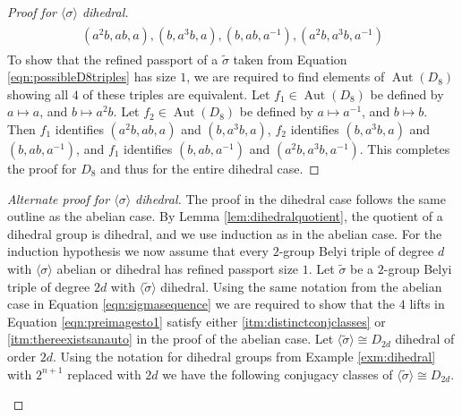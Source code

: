 \documentclass{dcthesis}
\newcommand{\wt}[1]{\widetilde{#1}}
\DeclareMathOperator{\Aut}{Aut}
\numberwithin{equation}{section}
\theoremstyle{definition}
\theoremstyle{remark}
\begin{document}
{{\begin{proof}[Proof for $\langle\sigma\rangle$ dihedral]
\begin{align}
\begin{split}
          (a^2b,ab,a),
          (b,a^3b,a),
          (b,ab,a^{-1}),
          (a^2b,a^3b,a^{-1})
        \end{split}
      \end{align}
      To show that the refined passport
      of a $\wt{\sigma}$ taken from
      Equation \ref{eqn:possibleD8triples}
      has size $1$,
      we are required to find elements of
      $\Aut(D_8)$
      showing all $4$ of these triples are
      equivalent.
      Let $f_1\in\Aut(D_8)$ be defined by
      $a\mapsto a$, and
      $b\mapsto a^2b$.
      Let $f_2\in\Aut(D_8)$ be defined by
      $a\mapsto a^{-1}$, and
      $b\mapsto b$.
      Then $f_1$ identifies
      $(a^2b,ab,a)$
      and
      $(b,a^3b,a)$,
      $f_2$ identifies
      $(b,a^3b,a)$
      and
      $(b,ab,a^{-1})$,
      and
      $f_1$ identifies
      $(b,ab,a^{-1})$
      and
      $(a^2b,a^3b,a^{-1})$.
      This completes the proof for $D_8$
      and thus for the entire dihedral case.
    \end{proof}
    \begin{proof}[Alternate proof for $\langle\sigma\rangle$ dihedral]
      The proof in the dihedral case
      follows the same outline as the abelian case.
      By Lemma \ref{lem:dihedralquotient},
      the quotient of a dihedral group is
      dihedral, and we use induction
      as in the abelian case.
      For the induction hypothesis we now assume
      that every $2$-group Belyi triple of degree
      $d$ with $\langle\sigma\rangle$
      abelian or dihedral has
      refined passport size $1$.
      Let $\wt{\sigma}$
      be a $2$-group Belyi triple of degree $2d$
      with $\langle\wt{\sigma}\rangle$
      dihedral.
      Using the same notation from
      the abelian case in
      Equation \ref{eqn:sigmasequence}
      we are required to show that the
      $4$ lifts in
      Equation \ref{eqn:preimagesto1}
      satisfy either
      \ref{itm:distinctconjclasses}
      or
      \ref{itm:thereexistsanauto}
      in the proof of the abelian case.
      Let $\langle\wt{\sigma}\rangle\cong D_{2d}$
      dihedral of order $2d$.
      Using the notation for dihedral groups
      from Example \ref{exm:dihedral}
      with $2^{n+1}$ replaced with $2d$
      we have the following conjugacy classes
      of $\langle\wt{\sigma}\rangle\cong D_{2d}$.
      \begin{itemize}

\end{itemize}
\end{proof}}}
\end{document}
